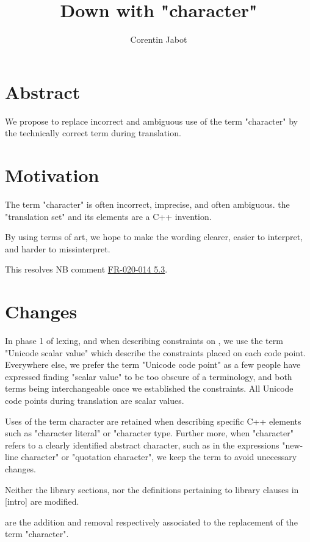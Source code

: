 \documentclass{wg21}
\title{Down with "character"}
\author{Corentin Jabot}{corentin.jabot@gmail.com}
\begin{document}
\maketitle

\section{Abstract}

We propose to replace incorrect and ambiguous use of the term "character" by the technically correct term during translation.

\section{Motivation}

The term "character" is often incorrect, imprecise, and often ambiguous.
the "translation set" and its elements are a C++ invention.

By using terms of art, we hope to make the wording clearer, easier to interpret, and harder to missinterpret.

This resolves NB comment \href{https://github.com/cplusplus/nbballot/issues/422}{FR-020-014 5.3}.

\section{Changes}

In phase 1 of lexing, and when describing constraints on , we use the term "Unicode scalar value"
which describe the constraints placed on each code point. Everywhere else, we prefer the term "Unicode code point" as a few people have
expressed finding "scalar value" to be too obscure of a terminology, and both terms being interchangeable once we established the constraints.
All Unicode code points during translation are scalar values.

Uses of the term character are retained when describing specific C++ elements such as "character literal"  or "character type.
Further more, when "character" refers to a clearly identified abstract character, such as in the expressions "new-line character" or
"quotation character", we keep the term to avoid unecessary changes.

Neither the library sections, nor the definitions pertaining to library clauses in [intro] are modified.


 are the addition and removal respectively associated to the replacement of the term "character".
\end{document}
